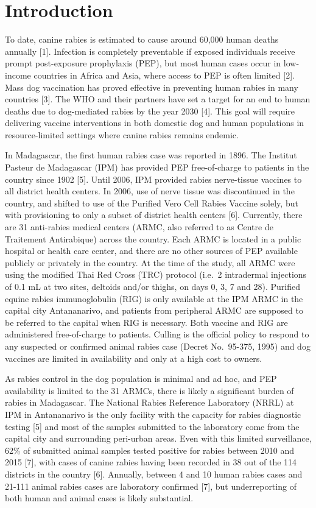 \documentclass[
  oneside]{book}
\begin{document}
\hypertarget{introduction-1}{%
\section{Introduction}\label{introduction-1}}

To date, canine rabies is estimated to cause around 60,000 human deaths annually {[}1{]}. Infection is completely preventable if exposed individuals receive prompt post-exposure prophylaxis (PEP), but most human cases occur in low-income countries in Africa and Asia, where access to PEP is often limited {[}2{]}. Mass dog vaccination has proved effective in preventing human rabies in many countries {[}3{]}. The WHO and their partners have set a target for an end to human deaths due to dog-mediated rabies by the year 2030 {[}4{]}. This goal will require delivering vaccine interventions in both domestic dog and human populations in resource-limited settings where canine rabies remains endemic.

In Madagascar, the first human rabies case was reported in 1896. The Institut Pasteur de Madagascar (IPM) has provided PEP free-of-charge to patients in the country since 1902 {[}5{]}. Until 2006, IPM provided rabies nerve-tissue vaccines to all district health centers. In 2006, use of nerve tissue was discontinued in the country, and shifted to use of the Purified Vero Cell Rabies Vaccine solely, but with provisioning to only a subset of district health centers {[}6{]}. Currently, there are 31 anti-rabies medical centers (ARMC, also referred to as Centre de Traitement Antirabique) across the country. Each ARMC is located in a public hospital or health care center, and there are no other sources of PEP available publicly or privately in the country. At the time of the study, all ARMC were using the modified Thai Red Cross (TRC) protocol (i.e.~2 intradermal injections of 0.1 mL at two sites, deltoids and/or thighs, on days 0, 3, 7 and 28). Purified equine rabies immunoglobulin (RIG) is only available at the IPM ARMC in the capital city Antananarivo, and patients from peripheral ARMC are supposed to be referred to the capital when RIG is necessary. Both vaccine and RIG are administered free-of-charge to patients. Culling is the official policy to respond to any suspected or confirmed animal rabies case (Decret No.~95-375, 1995) and dog vaccines are limited in availability and only at a high cost to owners.

As rabies control in the dog population is minimal and ad hoc, and PEP availability is limited to the 31 ARMCs, there is likely a significant burden of rabies in Madagascar. The National Rabies Reference Laboratory (NRRL) at IPM in Antananarivo is the only facility with the capacity for rabies diagnostic testing {[}5{]} and most of the samples submitted to the laboratory come from the capital city and surrounding peri-urban areas. Even with this limited surveillance, 62\% of submitted animal samples tested positive for rabies between 2010 and 2015 {[}7{]}, with cases of canine rabies having been recorded in 38 out of the 114 districts in the country {[}6{]}. Annually, between 4 and 10 human rabies cases and 21-111 animal rabies cases are laboratory confirmed {[}7{]}, but underreporting of both human and animal cases is likely substantial.
\end{document}
